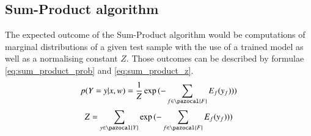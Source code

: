 \subsection{Sum-Product algorithm}
The expected outcome of the Sum-Product algorithm would be computations of marginal distributions of a given test sample with the use of a trained model as well as a normalising constant $Z$. Those outcomes can be described by formulae \ref{eq:sum_product_prob} and \ref{eq:sum_product_z}.
\begin{equation}
    \label{eq:sum_product_prob}
    p(Y=y|x,w)=\frac{1}{Z}\exp{(-\sum_{f \in \pazocal{F}}{E_f(y_f)})}) 
\end{equation}
\begin{equation}
    \label{eq:sum_product_z}
     Z=\sum_{y \in \pazocal{Y}}{\exp{(-\sum_{f \in \pazocal{F}}{E_f(y_f)})})} 
\end{equation}

